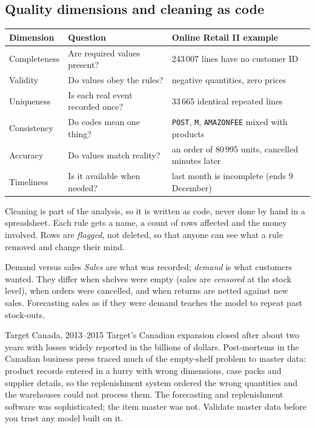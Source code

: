 \subsection{Quality dimensions and cleaning as code}
\begin{center}\small
\begin{tabularx}{\linewidth}{@{}L{2.6cm}Y L{4.6cm}@{}}
\toprule
\textbf{Dimension} & \textbf{Question} & \textbf{Online Retail II example}\\\midrule
Completeness & Are required values present? & 243\,007 lines have no customer ID\\
Validity & Do values obey the rules? & negative quantities, zero prices\\
Uniqueness & Is each real event recorded once? & 33\,665 identical repeated lines\\
Consistency & Do codes mean one thing? & \texttt{POST}, \texttt{M}, \texttt{AMAZONFEE} mixed with products\\
Accuracy & Do values match reality? & an order of 80\,995 units, cancelled minutes later\\
Timeliness & Is it available when needed? & last month is incomplete (ends 9 December)\\\bottomrule
\end{tabularx}
\end{center}

Cleaning is part of the analysis, so it is written as code, never done by hand in a spreadsheet. Each rule gets a
name, a count of rows affected and the money involved. Rows are \emph{flagged}, not deleted, so that anyone can see
what a rule removed and change their mind.

\begin{definition}{Demand versus sales}
\emph{Sales} are what was recorded; \emph{demand} is what customers wanted. They differ when shelves were empty
(sales are \emph{censored} at the stock level), when orders were cancelled, and when returns are netted against new
sales. Forecasting sales as if they were demand teaches the model to repeat past stock-outs.
\end{definition}

\begin{realcase}{Target Canada, 2013--2015}
Target's Canadian expansion closed after about two years with losses widely reported in the billions of dollars.
Post-mortems in the Canadian business press traced much of the empty-shelf problem to master data: product records
entered in a hurry with wrong dimensions, case packs and supplier details, so the replenishment system ordered the
wrong quantities and the warehouses could not process them. The forecasting and replenishment software was
sophisticated; the item master was not. Validate master data before you trust any model built on it.
\end{realcase}

